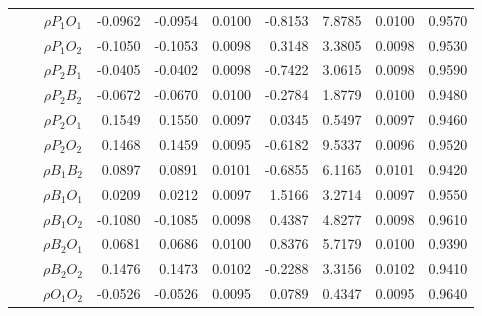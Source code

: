 \documentclass[letterpaper]{article}
\begin{document}
\begin{table}[h]
\begin{tabular}{cccrrrrrrr}
            &             & $\rho{P_1O_1}$ & -0.0962                & -0.0954                & 0.0100                 & -0.8153                & 7.8785                 & 0.0100                   & 0.9570                 \\
            &             & $\rho{P_1O_2}$ & -0.1050                & -0.1053                & 0.0098                 & 0.3148                 & 3.3805                 & 0.0098                   & 0.9530                 \\
            &             & $\rho{P_2B_1}$ & -0.0405                & -0.0402                & 0.0098                 & -0.7422                & 3.0615                 & 0.0098                   & 0.9590                 \\
            &             & $\rho{P_2B_2}$ & -0.0672                & -0.0670                & 0.0100                 & -0.2784                & 1.8779                 & 0.0100                   & 0.9480                 \\
            &             & $\rho{P_2O_1}$ & 0.1549                 & 0.1550                 & 0.0097                 & 0.0345                 & 0.5497                 & 0.0097                   & 0.9460                 \\
            &             & $\rho{P_2O_2}$ & 0.1468                 & 0.1459                 & 0.0095                 & -0.6182                & 9.5337                 & 0.0096                   & 0.9520                 \\
            &             & $\rho{B_1B_2}$ & 0.0897                 & 0.0891                 & 0.0101                 & -0.6855                & 6.1165                 & 0.0101                   & 0.9420                 \\
            &             & $\rho{B_1O_1}$ & 0.0209                 & 0.0212                 & 0.0097                 & 1.5166                 & 3.2714                 & 0.0097                   & 0.9550                 \\
            &             & $\rho{B_1O_2}$ & -0.1080                & -0.1085                & 0.0098                 & 0.4387                 & 4.8277                 & 0.0098                   & 0.9610                 \\
            &             & $\rho{B_2O_1}$ & 0.0681                 & 0.0686                 & 0.0100                 & 0.8376                 & 5.7179                 & 0.0100                   & 0.9390                 \\
            &             & $\rho{B_2O_2}$ & 0.1476                 & 0.1473                 & 0.0102                 & -0.2288                & 3.3156                 & 0.0102                   & 0.9410                 \\
            &             & $\rho{O_1O_2}$ & -0.0526                & -0.0526                & 0.0095                 & 0.0789                 & 0.4347                 & 0.0095                   & 0.9640                 \\ \hline
\end{tabular}
\end{table}
\end{document}

